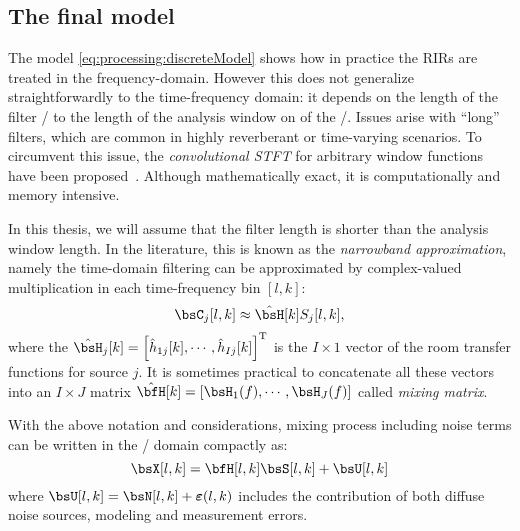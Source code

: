 \begin{figure}[t]
    \begin{fullwidthfig}
    \centering
        
    \end{fullwidthfig}
\end{figure}


\subsection{The final model}
The model \eqref{eq:processing:discreteModel} shows how in practice the RIRs are treated in the frequency-domain.
However this does not generalize straightforwardly to the time-frequency domain:
it depends on the length of the filter \wrt/ to the length of the analysis window on of the \STFT/.
Issues arise with ``long'' filters, which are common in highly reverberant or time-varying scenarios.
To circumvent this issue, the \textit{convolutional STFT} for arbitrary window functions have been proposed~.
Although mathematically exact, it is computationally and memory intensive.

In this thesis, we will assume that the filter length is shorter than the analysis window length.
In the literature, this is known as the \textit{narrowband approximation}, namely the time-domain filtering can be approximated by complex-valued multiplication in each time-frequency bin $[l,k]$:
\begin{equation}
    \IMGS_j[l,k] \approx \hat{\FLTS}[k] \SRC_j[l,k]
    ,
\end{equation}
where the $\hat{\FLTS}_j[k] = \ktranspose{\klist{\hat{\flt}_{1j}[k], \cdots, \hat{\flt}_{Ij}[k]}}$ is the $I \times 1$ vector of the room transfer functions for source $j$.
It is sometimes practical to concatenate all these vectors into an $I \times J$ matrix $\hat{\FLTSS}[k] = \klist{\FLTS_1(f),\cdots,\FLTS_J(f)}$ called \textit{mixing matrix}.

With the above notation and considerations, mixing process including noise terms can be written in the \STFT/ domain compactly as:
\begin{equation}\label{eq:processing:model:stfs}
    \MICS[l,k] = \FLTSS[l,k] \SRCS[l,k] + \bsU[l,k]
\end{equation}
where $\bsU[l,k] = \bsN[l,k] + \boldsymbol{\varepsilon}(l,k)$ includes the contribution of both diffuse noise sources, modeling and measurement errors.

